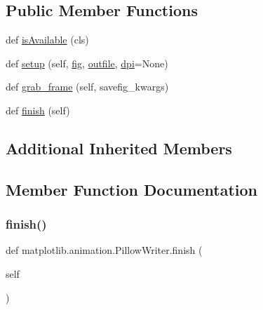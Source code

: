 \subsection*{Public Member Functions}
\begin{DoxyCompactItemize}
\item 
def \hyperlink{classmatplotlib_1_1animation_1_1PillowWriter_a5365d12c884bd6b8e0d8c666f67597d0}{is\+Available} (cls)
\item 
def \hyperlink{classmatplotlib_1_1animation_1_1PillowWriter_aea635b360aa9fd52ed0f308b2c2d233b}{setup} (self, \hyperlink{classmatplotlib_1_1animation_1_1AbstractMovieWriter_a835eff7e0ac625992e7f708448e88fa6}{fig}, \hyperlink{classmatplotlib_1_1animation_1_1AbstractMovieWriter_ae2006c1ca69618ec02514264a9f318e1}{outfile}, \hyperlink{classmatplotlib_1_1animation_1_1AbstractMovieWriter_aaca5ed6ef95c99e03830b346425ee9bc}{dpi}=None)
\item 
def \hyperlink{classmatplotlib_1_1animation_1_1PillowWriter_a24aabf5b133718dc87b1f428b7619998}{grab\+\_\+frame} (self, savefig\+\_\+kwargs)
\item 
def \hyperlink{classmatplotlib_1_1animation_1_1PillowWriter_af65b6a4f880376e32bf139b3a7a44163}{finish} (self)
\end{DoxyCompactItemize}
\subsection*{Additional Inherited Members}


\subsection{Member Function Documentation}
\mbox{\label{classmatplotlib_1_1animation_1_1PillowWriter_af65b6a4f880376e32bf139b3a7a44163}} 
\subsubsection{\texorpdfstring{finish()}{finish()}}
{\footnotesize\ttfamily def matplotlib.\+animation.\+Pillow\+Writer.\+finish (\begin{DoxyParamCaption}\item[{}]{self }\end{DoxyParamCaption})}

